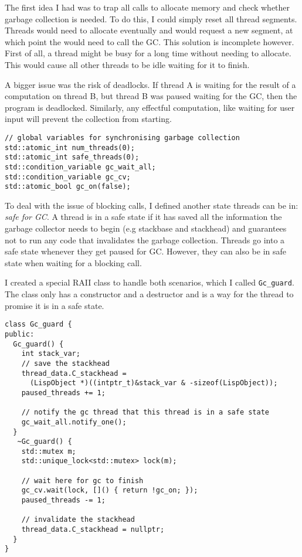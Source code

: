 The first idea I had was to trap all calls to allocate memory and check whether garbage collection is needed.
To do this, I could simply reset all thread segments. Threads would need to allocate eventually and
would request a new segment, at which point the would need to call the GC. This solution is incomplete however.
First of all, a thread might be busy for a long time without needing to allocate. This would cause all other
threads to be idle waiting for it to finish.

A bigger issue was the risk of deadlocks. If thread A is waiting for the result of a computation on thread B,
but thread B was paused waiting for the GC, then the program is deadlocked. Similarly, any effectful computation,
like waiting for user input will prevent the collection from starting.

\begin{verbatim}
// global variables for synchronising garbage collection
std::atomic_int num_threads(0);
std::atomic_int safe_threads(0);
std::condition_variable gc_wait_all;
std::condition_variable gc_cv;
std::atomic_bool gc_on(false);
\end{verbatim}

To deal with the issue of blocking calls, I defined another state threads can be in: \emph{safe for GC}. A thread
is in a safe state if it has saved all the information the garbage collector needs to begin (e.g stackbase
and stackhead) and guarantees not to run any code that invalidates the garbage collection. Threads go into a safe
state whenever they get paused for GC. However, they can also be in safe state when waiting for a blocking call.

I created a special RAII class to handle both scenarios, which I called \texttt{Gc\_guard}. The class only has a constructor
and a destructor and is a way for the thread to promise it is in a safe state.

\begin{verbatim}
class Gc_guard {
public:
  Gc_guard() {
    int stack_var;
    // save the stackhead
    thread_data.C_stackhead =
      (LispObject *)((intptr_t)&stack_var & -sizeof(LispObject));
    paused_threads += 1;

    // notify the gc thread that this thread is in a safe state
    gc_wait_all.notify_one();
  }
   ~Gc_guard() {
    std::mutex m;
    std::unique_lock<std::mutex> lock(m);

    // wait here for gc to finish
    gc_cv.wait(lock, []() { return !gc_on; });
    paused_threads -= 1;

    // invalidate the stackhead
    thread_data.C_stackhead = nullptr;
  }
}
\end{verbatim}

